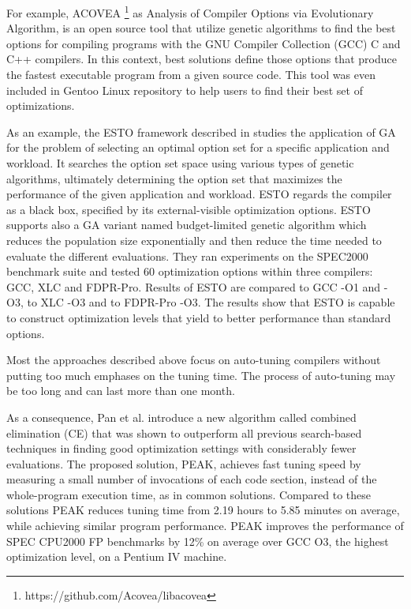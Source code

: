 For example, ACOVEA \footnote{https://github.com/Acovea/libacovea} as Analysis of Compiler Options via Evolutionary Algorithm, is an open source tool that utilize genetic algorithms to find the best options for compiling programs with the GNU Compiler Collection (GCC) C and C++ compilers. In this context, best solutions define those options that produce the fastest executable program from a given source code. This tool was even included in Gentoo Linux
repository to help users to find their best set of optimizations.

As an example, the ESTO framework described in \cite{bashkansky2007black} studies the application of GA for the problem of selecting an optimal option set for a specific application and workload. It searches the option set space using various types of genetic algorithms, ultimately determining the option set that maximizes the performance of the given application and workload. ESTO regards the compiler as a black box, specified by its external-visible optimization options. ESTO supports also a GA variant named budget-limited genetic algorithm which reduces the population size exponentially and then reduce the time needed to evaluate the different evaluations. They ran experiments on the SPEC2000 benchmark suite and tested 60 optimization options within three compilers: GCC, XLC and FDPR-Pro. Results of ESTO are compared to GCC -O1 and -O3, to XLC -O3 and to FDPR-Pro -O3. The results show that ESTO is capable to construct optimization levels that yield to better performance than standard options.

Most the approaches described above focus on auto-tuning compilers without putting too much emphases on the tuning time. The process of auto-tuning may be too long and can last more than one month\cite{hoste2008cole}.

As a consequence, Pan et al.\cite{pan2006fast} introduce a new algorithm called combined elimination (CE) that was shown to outperform all previous search-based techniques in finding good optimization settings with considerably fewer evaluations. The proposed solution, PEAK, achieves fast tuning speed by measuring a small number of invocations of each code section, instead of the whole-program execution time, as in common solutions. Compared to these solutions PEAK reduces tuning time from 2.19 hours to 5.85 minutes on average, while achieving similar program performance.
PEAK improves the performance of SPEC CPU2000 FP benchmarks by 12\% on average over GCC O3, the highest optimization level, on a Pentium IV machine.


